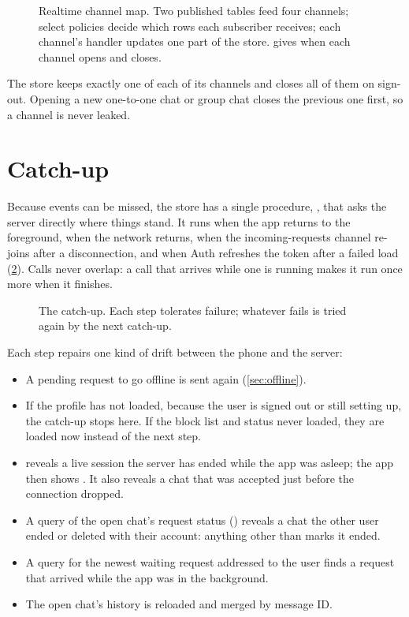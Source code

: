 \begin{figure}[ht]
  \centering
  
  \caption{Realtime channel map. Two published tables feed four channels; select policies decide which rows
    each subscriber receives; each channel's handler updates one part of the store.
     gives when each channel opens and closes.}
  \label{fig:realtime}
\end{figure}

The store keeps exactly one of each of its channels and closes all of them on sign-out. Opening a new
one-to-one chat or group chat closes the previous one first, so a channel is never leaked.

\section{Catch-up}
\label{sec:catch-up}

Because events can be missed, the store has a single procedure, , that asks the server
directly where things stand. It runs when the app returns to the foreground, when the network returns,
when the incoming-requests channel re-joins after a disconnection, and when Auth refreshes the token after
a failed load (\cref{fig:catch-up}). Calls never overlap: a call that arrives while one is running makes
it run once more when it finishes.

\begin{figure}[ht]
  \centering
  
  \caption{The catch-up. Each step tolerates failure; whatever fails is tried again by the next
    catch-up.}
  \label{fig:catch-up}
\end{figure}

Each step repairs one kind of drift between the phone and the server:

\begin{itemize}
  \item A pending request to go offline is sent again (\cref{sec:offline}).
  \item If the profile has not loaded, because the user is signed out or still setting up, the catch-up
    stops here. If the block list and status never loaded, they are loaded now instead of the next step.
  \item {} reveals a live session the server has ended while the app was asleep; the app
    then shows . It also reveals a chat that was accepted just before the connection
    dropped.
  \item A query of the open chat's request status () reveals a chat the other
    user ended or deleted with their account: anything other than  marks it ended.
  \item A query for the newest waiting request addressed to the user finds a request that arrived while
    the app was in the background.
  \item The open chat's history is reloaded and merged by message ID.
\end{itemize}

